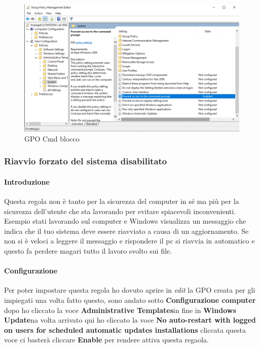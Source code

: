 \documentclass[../main.tex]{subfiles}
\begin{document}
\begin{figure}[h]
    \centering
    \includegraphics[width=1\textwidth]{Images/CmdBlocco.png}
    \caption{GPO Cmd blocco}
\end{figure}

\pagebreak{}
\thispagestyle{header-pages}

\subsubsection{Riavvio forzato del sistema disabilitato}

\paragraph{Introduzione}
Questa regola non è tanto per la sicurezza del computer in sé ma più per la sicurezza dell'utente che sta lavorando per evitare spiacevoli inconvenienti. Esempio stati lavorando sul computer e Windows visualizza un messaggio che indica che il tuo sistema deve essere riavviato a causa di un aggiornamento. Se non si è veloci a leggere il messaggio e rispondere il pc si riavvia in automatico e questo fa perdere magari tutto il lavoro svolto sui file.


\paragraph{Configurazione}
Per poter impostare questa regola ho dovuto aprire in \textit{edit} la GPO creata per gli impiegati una volta fatto questo, sono andato sotto \textbf{Configurazione computer} dopo ho cliccato la voce \textbf{Administrative Templates}in fine in \textbf{Windows Update}na volta arrivato qui ho cliccato la voce \textbf{No auto-restart with logged on users for scheduled automatic updates installations} cliccata questa voce ci basterà cliccare \textbf{Enable} per rendere attiva questa regaola.
\end{document}
